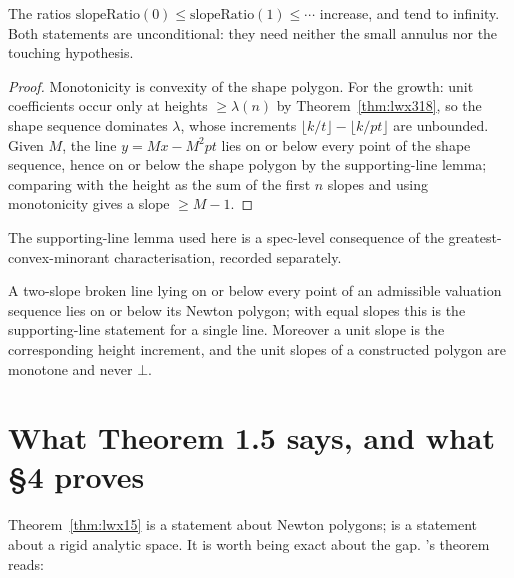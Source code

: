 \begin{theorem}
  \label{thm:slope-growth}
  \leanok
  The ratios $\mathrm{slopeRatio}(0)\leq\mathrm{slopeRatio}(1)\leq\cdots$ increase, and tend to
  infinity.  Both statements are unconditional: they need neither the small annulus nor the
  touching hypothesis.
\end{theorem}

\begin{proof}
  \leanok
  Monotonicity is convexity of the shape polygon.  For the growth: unit coefficients occur only
  at heights $\geq\lambda(n)$ by Theorem~\ref{thm:lwx318}, so the shape sequence dominates
  $\lambda$, whose increments $\lfloor k/t\rfloor-\lfloor k/pt\rfloor$ are unbounded.  Given $M$,
  the line $y = Mx - M^{2}pt$ lies on or below every point of the shape sequence, hence on or
  below the shape polygon by the supporting-line lemma; comparing with the height as the sum of
  the first $n$ slopes and using monotonicity gives a slope $\geq M-1$.
\end{proof}

The supporting-line lemma used here is a spec-level consequence of the greatest-convex-minorant
characterisation, recorded separately.

\begin{lemma}
  \label{lem:supporting-line}
  \leanok
  A two-slope broken line lying on or below every point of an admissible valuation sequence lies
  on or below its Newton polygon; with equal slopes this is the supporting-line statement for a
  single line.  Moreover a unit slope is the corresponding height increment, and the unit slopes
  of a constructed polygon are monotone and never $\bot$.
\end{lemma}

\section{What Theorem 1.5 says, and what \S4 proves}
\label{sec:what-15-says}

Theorem~\ref{thm:lwx15} is a statement about Newton polygons; \cite[Theorem 1.5]{LWX} is a
statement about a rigid analytic space.  It is worth being exact about the gap.  \cite{LWX}'s
theorem reads:

